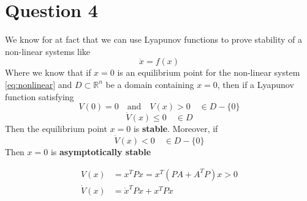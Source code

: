 \chapter{Question 4}
We know for at fact that we can use Lyapunov functions to prove stability of a non-linear systems like
\begin{equation}
        \dot{x} = f(x)
        \label{eq:nonlinear}
\end{equation}
Where we know that if $x = 0$ is an equilibrium point for the non-linear system \ref{eq:nonlinear} and $D \subset \mathbb{R}^n$ be a domain containing $x = 0$, then if a Lyapunov function satisfying
\begin{equation}
        V(0) = 0 \quad \text{and} \quad V(x) > 0 \quad \in D - \{0\}
\end{equation}
\begin{equation}
        \dot{V}(x) \leq 0 \quad \in D
\end{equation}
Then the equilibrium point $x = 0$ is \textbf{stable}. Moreover, if
\begin{equation}
        \dot{V}(x) < 0 \quad \in D - \{0\}
\end{equation}
Then $x = 0$ is \textbf{asymptotically stable}

\begin{equation}
        \begin{split}
                V(x) &= x^T P x = x^T(P A + A^T P)x > 0 \\
                \dot{V}(x) &= \dot{x}^T P x + x^T P \dot{x}
        \end{split}
\end{equation}